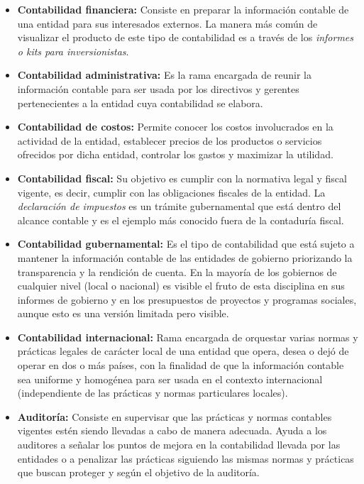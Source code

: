 \documentclass[letterpaper, 12pt]{article}
\begin{document}
			\begin{itemize}

				\item \textbf{Contabilidad financiera:} Consiste en preparar la información contable de una entidad para sus interesados externos. La manera más común de visualizar el producto de este tipo de contabilidad es a través de los \emph{informes o kits para inversionistas}.
				\item \textbf{Contabilidad administrativa:} Es la rama encargada de reunir la información contable para ser usada por los directivos y gerentes pertenecientes a la entidad cuya contabilidad se elabora.
				\item \textbf{Contabilidad de costos:} Permite conocer los costos involucrados en la actividad de la entidad, establecer precios de los productos o servicios ofrecidos por dicha entidad, controlar los gastos y maximizar la utilidad.
				\item \textbf{Contabilidad fiscal:} Su objetivo es cumplir con la normativa legal y fiscal vigente, es decir, cumplir con las obligaciones fiscales de la entidad. La \emph{declaración de impuestos} es un trámite gubernamental que está dentro del alcance contable y es el ejemplo más conocido fuera de la contaduría fiscal.
				\item \textbf{Contabilidad gubernamental:} Es el tipo de contabilidad que está sujeto a mantener la información contable de las entidades de gobierno priorizando la transparencia y la rendición de cuenta. En la mayoría de los gobiernos de cualquier nivel (local o nacional) es visible el fruto de esta disciplina en sus informes de gobierno y en los presupuestos de proyectos y programas sociales, aunque esto es una versión limitada pero visible.
				\item \textbf{Contabilidad internacional:} Rama encargada de orquestar varias normas y prácticas legales de carácter local de una entidad que opera, desea o dejó de operar en dos o más países, con la finalidad de que la información contable sea uniforme y homogénea para ser usada en el contexto internacional (independiente de las prácticas y normas particulares locales).
				\item \textbf{Auditoría:} Consiste en supervisar que las prácticas y normas contables vigentes estén siendo llevadas a cabo de manera adecuada. Ayuda a los auditores a señalar los puntos de mejora en la contabilidad llevada por las entidades o a penalizar las prácticas siguiendo las mismas normas y prácticas que buscan proteger y según el objetivo de la auditoría.
			
			\end{itemize}
\end{document}
